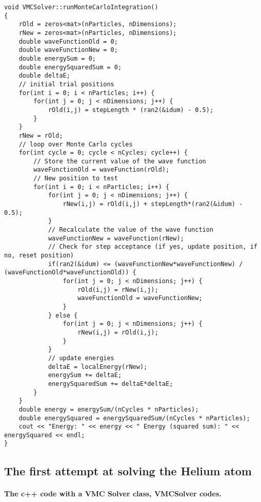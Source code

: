 \documentclass[%
twoside,                 %
final,                   %
10pt]{article}
\begin{document}
\begin{verbatim}
void VMCSolver::runMonteCarloIntegration()
{
    rOld = zeros<mat>(nParticles, nDimensions);
    rNew = zeros<mat>(nParticles, nDimensions);
    double waveFunctionOld = 0;
    double waveFunctionNew = 0;
    double energySum = 0;
    double energySquaredSum = 0;
    double deltaE;
    // initial trial positions
    for(int i = 0; i < nParticles; i++) {
        for(int j = 0; j < nDimensions; j++) {
            rOld(i,j) = stepLength * (ran2(&idum) - 0.5);
        }
    }
    rNew = rOld;
    // loop over Monte Carlo cycles
    for(int cycle = 0; cycle < nCycles; cycle++) {
        // Store the current value of the wave function
        waveFunctionOld = waveFunction(rOld);
        // New position to test
        for(int i = 0; i < nParticles; i++) {
            for(int j = 0; j < nDimensions; j++) {
                rNew(i,j) = rOld(i,j) + stepLength*(ran2(&idum) - 0.5);
            }
            // Recalculate the value of the wave function
            waveFunctionNew = waveFunction(rNew);
            // Check for step acceptance (if yes, update position, if no, reset position)
            if(ran2(&idum) <= (waveFunctionNew*waveFunctionNew) / (waveFunctionOld*waveFunctionOld)) {
                for(int j = 0; j < nDimensions; j++) {
                    rOld(i,j) = rNew(i,j);
                    waveFunctionOld = waveFunctionNew;
                }
            } else {
                for(int j = 0; j < nDimensions; j++) {
                    rNew(i,j) = rOld(i,j);
                }
            }
            // update energies
            deltaE = localEnergy(rNew);
            energySum += deltaE;
            energySquaredSum += deltaE*deltaE;
        }
    }
    double energy = energySum/(nCycles * nParticles);
    double energySquared = energySquaredSum/(nCycles * nParticles);
    cout << "Energy: " << energy << " Energy (squared sum): " << energySquared << endl;
}
\end{verbatim}




\subsection*{The first attempt at solving the Helium atom}

\paragraph{The c++ code with a VMC Solver class, VMCSolver codes.}
\end{document}
